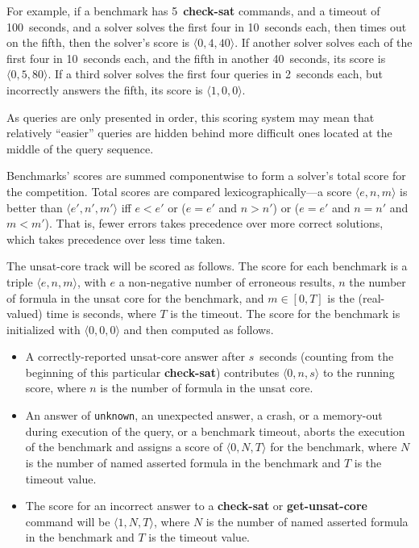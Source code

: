 \documentclass[12pt]{article}
\newcommand{\akey}[1]{\textbf{#1}}
\begin{document}
For example, if a benchmark has 5~\akey{check-sat} commands, and a
timeout of 100~seconds, and a solver solves the first four in
10~seconds each, then times out on the fifth, then the solver's score
is $\langle0,4,40\rangle$.  If another solver solves each of the first
four in 10~seconds each, and the fifth in another 40~seconds, its
score is $\langle0,5,80\rangle$.  If a third solver solves the first
four queries in 2~seconds each, but incorrectly answers the fifth, its
score is $\langle1,0,0\rangle$.

As queries are only presented in order, this scoring system may mean
that relatively ``easier'' queries are hidden behind more difficult
ones located at the middle of the query sequence.

Benchmarks' scores are summed componentwise to form a solver's total
score for the competition.
Total scores are compared lexicographically---a score $\langle e,n,m\rangle$ is better than 
$\langle e',n',m'\rangle$ iff $e < e'$ or ($e = e'$ and $n > n'$) or ($e = e'$ and $n = n'$ and $m < m'$).
That is, fewer errors takes precedence over more correct solutions, which takes precedence over less time taken.


The unsat-core track will be scored as follows. The score for each benchmark is a triple $\langle e,n,m\rangle$, with
$e$ a non-negative number of erroneous results,
$n$ the number of formula in the unsat core for the benchmark,
and $m\in[0,T]$ is the (real-valued) time is seconds, where $T$ is
the timeout. 
The score for the benchmark is initialized with
$\langle0,0,0\rangle$ and then computed as follows.
\begin{itemize}
\item A correctly-reported unsat-core answer after
  $s$~seconds (counting from the beginning of this particular
  \akey{check-sat}) contributes $\langle0,n,s\rangle$ to the running
  score, where $n$ is the number of formula in the unsat core.
\item An answer of \texttt{unknown}, an unexpected answer, a crash, or a memory-out during
  execution of the query, or a benchmark timeout, aborts the execution
  of the benchmark and assigns a score of $\langle0,N,T\rangle$ for the benchmark, where
  $N$ is the number of named asserted formula in the benchmark and $T$ is the timeout value.
  
\item The score for an incorrect answer to a \akey{check-sat} or \akey{get-unsat-core} command 
  will be $\langle1,N,T\rangle$, where
  $N$ is the number of named asserted formula in the benchmark and $T$ is the timeout value.
\end{itemize}
\end{document}
